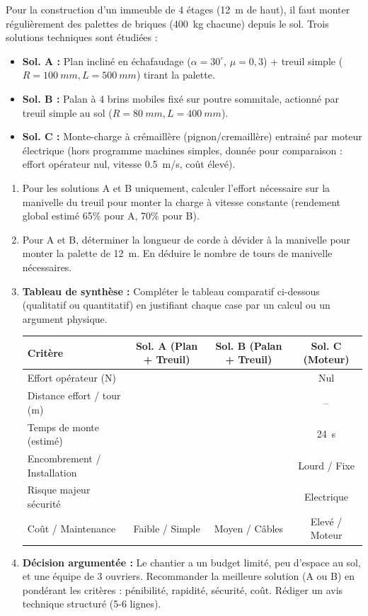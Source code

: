 \documentclass[11pt]{article}
\begin{document}
\begin{exercice}
Pour la construction d'un immeuble de 4 \'etages (\SI{12}{m} de haut), il faut monter r\'eguli\`erement des palettes de briques (\SI{400}{kg} chacune) depuis le sol. Trois solutions techniques sont \'etudi\'ees :
\begin{itemize}
    \item \textbf{Sol. A :} Plan inclin\'e en \'echafaudage ($\alpha = 30^\circ$, $\mu = 0,3$) + treuil simple ($R=\SI{100}{mm}, L=\SI{500}{mm}$) tirant la palette.
    \item \textbf{Sol. B :} Palan \`a 4 brins mobiles fix\'e sur poutre sommitale, actionn\'e par treuil simple au sol ($R=\SI{80}{mm}, L=\SI{400}{mm}$).
    \item \textbf{Sol. C :} Monte-charge \`a cr\'emaill\`ere (pignon/cremaill\`ere) entrain\'e par moteur \'electrique (hors programme machines simples, donn\'ee pour comparaison : effort op\'erateur nul, vitesse \SI{0,5}{m/s}, co\^ut \'elev\'e).
\end{itemize}
\begin{enumerate}
    \item Pour les solutions A et B uniquement, calculer l'effort n\'ecessaire sur la manivelle du treuil pour monter la charge \`a vitesse constante (rendement global estim\'e 65\% pour A, 70\% pour B).
    \item Pour A et B, d\'eterminer la longueur de corde \`a d\'evider \`a la manivelle pour monter la palette de \SI{12}{m}. En d\'eduire le nombre de tours de manivelle n\'ecessaires.
    \item \textbf{Tableau de synth\`ese :} Compl\'eter le tableau comparatif ci-dessous (qualitatif ou quantitatif) en justifiant chaque case par un calcul ou un argument physique.
    \begin{tabular}{|l|c|c|c|}
    \hline
    \textbf{Crit\`ere} & \textbf{Sol. A (Plan + Treuil)} & \textbf{Sol. B (Palan + Treuil)} & \textbf{Sol. C (Moteur)} \\ \hline
    Effort op\'erateur (N) & & & Nul \\ \hline
    Distance effort / tour (m) & & & -- \\ \hline
    Temps de monte (estim\'e) & & & \SI{24}{s} \\ \hline
    Encombrement / Installation & & & Lourd / Fixe \\ \hline
    Risque majeur s\'ecurit\'e & & & Electrique \\ \hline
    Co\^ut / Maintenance & Faible / Simple & Moyen / C\^ables & Elev\'e / Moteur \\ \hline
    \end{tabular}
    \item \textbf{D\'ecision argument\'ee :} Le chantier a un budget limit\'e, peu d'espace au sol, et une \'equipe de 3 ouvriers. Recommander la meilleure solution (A ou B) en pond\'erant les crit\`eres : p\'enibilit\'e, rapidit\'e, s\'ecurit\'e, co\^ut. R\'ediger un avis technique structur\'e (5-6 lignes).
\end{enumerate}
\end{exercice}
\end{document}
